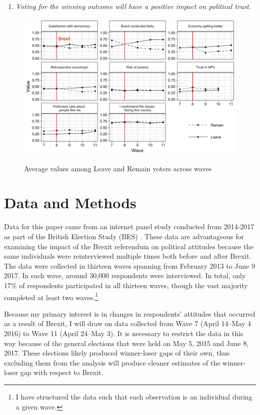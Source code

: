 \documentclass[12pt, letter]{article}
\begin{document}

\begin{enumerate}[label= \textbf{Hypothesis 4c (H4c)},  leftmargin=*]
  \item \textit{Voting for the winning outcome will have a positive impact on political trust.}
\end{enumerate}

\begin{figure}[t]
\caption{Average values among Leave and Remain voters across waves}
\includegraphics[scale=0.22]{plot_trends.png}
\label{fig:trends}
\end{figure}

\section{Data and Methods}

Data for this paper came from an internet panel study conducted from 2014-2017 as part of the British Election Study (BES) \parencite{bespanel}. These data are advantageous for examining the impact of the Brexit referendum on political attitudes because the same individuals were reinterviewed multiple times both before and after Brexit. The data were collected in thirteen waves spanning from February 2013 to June 9 2017. In each wave, around 30,000 respondents were interviewed. In total, only 17\% of respondents participated in all thirteen waves, though the vast majority completed at least two waves.\footnote{I have structured the data such that each observation is an individual during a given wave.} 

Because my primary interest is in changes in respondents' attitudes that occurred as a result of Brexit, I will draw on data collected from Wave 7 (April 14--May 4 2016) to Wave 11 (April 24--May 3). It is necessary to restrict the data in this way because of the general elections that were held on May 5, 2015 and June 8, 2017. These elections likely produced winner-loser gaps of their own, thus excluding them from the analysis will produce cleaner estimates of the winner-loser gap with respect to Brexit. 
\end{document}
